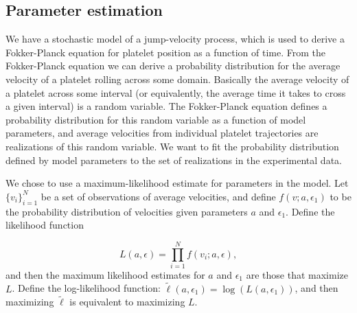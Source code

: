 
\subsection{Parameter estimation}
\label{sec:parameter-estimation}


We have a stochastic model of a jump-velocity process, which is used
to derive a Fokker-Planck equation for platelet position as a function
of time. From the Fokker-Planck equation we can derive a probability
distribution for the average velocity of a platelet rolling across
some domain. Basically the average velocity of a platelet across some
interval (or equivalently, the average time it takes to cross a given
interval) is a random variable. The Fokker-Planck equation defines a
probability distribution for this random variable as a function of
model parameters, and average velocities from individual platelet
trajectories are realizations of this random variable. We want to fit
the probability distribution defined by model parameters to the set of
realizations in the experimental data.

We chose to use a maximum-likelihood estimate for parameters in the
model. Let $\{v_i\}_{i=1}^N$ be a set of observations of average
velocities, and define $f(v;a, \epsilon_1)$ to be the probability
distribution of velocities given parameters $a$ and $\epsilon_1$. Define
the likelihood function

\begin{equation}
  \label{eq:likelihood}
  L(a, \epsilon) = \prod_{i=1}^N f(v_i; a, \epsilon),
\end{equation}
and then the maximum likelihood estimates for $a$ and $\epsilon_1$ are
those that maximize $L$. Define the log-likelihood function:
$\tilde{\ell}(a, \epsilon_1) = \log(L(a, \epsilon_1))$, and then
maximizing $\tilde{\ell}$ is equivalent to maximizing $L$.

